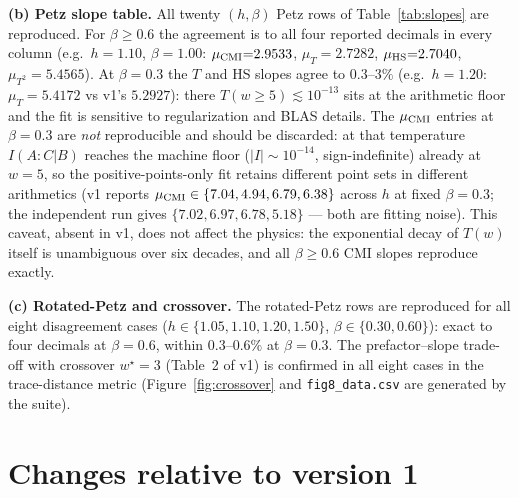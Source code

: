\documentclass[11pt]{article}
\begin{document}
\textbf{(b) Petz slope table.} All twenty $(h,\beta)$ Petz rows of
Table~\ref{tab:slopes} are reproduced. For $\beta \ge 0.6$ the agreement is
to all four reported decimals in every column (e.g.\ $h{=}1.10$,
$\beta{=}1.00$: $\mu_{\rm CMI}{=}2.9533$, $\mu_T{=}2.7282$,
$\mu_{\rm HS}{=}2.7040$, $\mu_{T^2}{=}5.4565$). At $\beta = 0.3$ the $T$ and
HS slopes agree to $0.3$--$3\%$ (e.g.\ $h{=}1.20$: $\mu_T = 5.4172$ vs v1's
$5.2927$): there $T(w{\ge}5) \lesssim 10^{-13}$ sits at the arithmetic floor
and the fit is sensitive to regularization and BLAS details. The
$\mu_{\rm CMI}$ entries at $\beta = 0.3$ are \emph{not} reproducible and
should be discarded: at that temperature $I(A:C|B)$ reaches the machine floor
($|I| \sim 10^{-14}$, sign-indefinite) already at $w = 5$, so the
positive-points-only fit retains different point sets in different
arithmetics (v1 reports $\mu_{\rm CMI} \in \{7.04, 4.94, 6.79, 6.38\}$
across $h$ at fixed $\beta=0.3$; the independent run gives
$\{7.02, 6.97, 6.78, 5.18\}$ --- both are fitting noise). This caveat, absent
in v1, does not affect the physics: the exponential decay of $T(w)$ itself is
unambiguous over six decades, and all $\beta \ge 0.6$ CMI slopes reproduce
exactly.

\textbf{(c) Rotated-Petz and crossover.} The rotated-Petz rows are reproduced
for all eight disagreement cases ($h \in \{1.05,1.10,1.20,1.50\}$,
$\beta \in \{0.30,0.60\}$): exact to four decimals at $\beta = 0.6$, within
$0.3$--$0.6\%$ at $\beta = 0.3$. The prefactor--slope trade-off with
crossover $w^\star = 3$ (Table~2 of v1) is confirmed in all eight cases in
the trace-distance metric (Figure~\ref{fig:crossover} and
\texttt{fig8\_data.csv} are generated by the suite).

\section{Changes relative to version 1}
\end{document}
